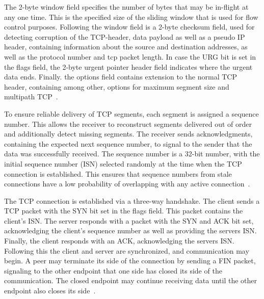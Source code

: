 \documentclass[english, 12pt, a4paper, elec, utf8, a-2b, online]{aaltothesis}
\begin{document}
The 2-byte window field specifies the number of bytes that may be in-flight at any one
time. This is the specified size of the sliding window that is used for flow
control purposes. Following the window field is a 2-byte checksum field, used for
detecting corruption of the TCP-header, data payload as well as a pseudo IP header,
containing information about the source and destination addresses, as well as the
protocol number and tcp packet length. In case the URG bit is set in the flags field,
the 2-byte urgent pointer header field indicates where the urgent data ends. Finally.
the options field contains extension to the normal TCP header, containing among other, options
for maximum segment size and multipath TCP~\cite{rfc8684}.

To ensure reliable delivery of TCP segments, each segment is assigned a sequence number.
This allows the receiver to reconstruct segments delivered out of order and additionally
detect missing segments. The receiver sends acknowledgments, containing the expected next
sequence number, to signal to the sender that the data was successfully received.
The sequence number is a 32-bit number, with the initial sequence number (ISN)
selected randomly at the time when the TCP connection is established. This ensures that
sequence numbers from stale connections have a low probability of overlapping with
any active connection~\cite{rfc793}.

The TCP connection is established via a three-way handshake. The client sends
a TCP packet with the SYN bit set in the flags field. This packet contains the
client's ISN. The server responds with a packet with the SYN and ACK bit set,
acknowledging the client's sequence number as well as providing the servers ISN.
Finally, the client responds with an ACK, acknowledging the servers ISN. Following
this the client and server are synchronized, and communication may begin. A peer
may terminate its side of the connection by sending a FIN packet, signaling to
the other endpoint that one side has closed its side of the communication. The
closed endpoint may continue receiving data until the other endpoint also closes
its side~\cite{rfc793}.
\end{document}
